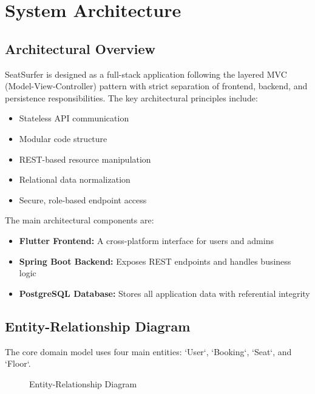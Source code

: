 \documentclass[12pt,a4paper]{report}
\begin{document}
\newpage

\chapter{System Architecture}

\section{Architectural Overview}

SeatSurfer is designed as a full-stack application following the layered MVC (Model-View-Controller) pattern with strict separation of frontend, backend, and persistence responsibilities. The key architectural principles include:

\begin{itemize}
    \item Stateless API communication
    \item Modular code structure
    \item REST-based resource manipulation
    \item Relational data normalization
    \item Secure, role-based endpoint access
\end{itemize}

The main architectural components are:

\begin{itemize}
    \item \textbf{Flutter Frontend:} A cross-platform interface for users and admins
    \item \textbf{Spring Boot Backend:} Exposes REST endpoints and handles business logic
    \item \textbf{PostgreSQL Database:} Stores all application data with referential integrity
\end{itemize}

\section{Entity-Relationship Diagram}

The core domain model uses four main entities: `User`, `Booking`, `Seat`, and `Floor`.

\begin{figure}[H]
    \centering
    \caption{Entity-Relationship Diagram}
    \label{fig:erd}
\end{figure}
\end{document}
